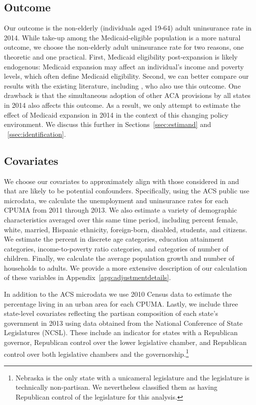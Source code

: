 \documentclass[aoas]{imsart}
\theoremstyle{plain}
\theoremstyle{remark}
\begin{document}
\subsection{Outcome}

Our outcome is the non-elderly (individuals aged 19-64) adult uninsurance rate in 2014. While take-up among the Medicaid-eligible population is a more natural outcome, we choose the non-elderly adult uninsurance rate for two reasons, one theoretic and one practical. First, Medicaid eligibility post-expansion is likely endogenous: Medicaid expansion may affect an individual's income and poverty levels, which often define Medicaid eligibility. Second, we can better compare our results with the existing literature, including \cite{courtemanche2017early}, who also use this outcome. One drawback is that the simultaneous adoption of other ACA provisions by all states in 2014 also affects this outcome. As a result, we only attempt to estimate the effect of Medicaid expansion in 2014 in the context of this changing policy environment. We discuss this further in Sections~\ref{ssec:estimand} and ~\ref{ssec:identification}. 

\subsection{Covariates}

We choose our covariates to approximately align with those considered in \cite{courtemanche2017early} and that are likely to be potential confounders. Specifically, using the ACS public use microdata, we calculate the unemployment and uninsurance rates for each CPUMA from 2011 through 2013. We also estimate a variety of demographic characteristics averaged over this same time period, including percent female, white, married, Hispanic ethnicity, foreign-born, disabled, students, and citizens. We estimate the percent in discrete age categories, education attainment categories, income-to-poverty ratio categories, and categories of number of children. Finally, we calculate the average population growth and number of households to adults. We provide a more extensive description of our calculation of these variables in Appendix~\ref{app:adjustmentdetails}.

In addition to the ACS microdata we use 2010 Census data to estimate the percentage living in an urban area for each CPUMA. Lastly, we include three state-level covariates reflecting the partisan composition of each state's government in 2013 using data obtained from the National Conference of State Legislatures (NCSL). These include an indicator for states with a Republican governor, Republican control over the lower legislative chamber, and Republican control over both legislative chambers and the governorship.\footnote{Nebraska is the only state with a unicameral legislature and the legislature is technically non-partisan. We nevertheless classified them as having Republican control of the legislature for this analysis.} 
\end{document}
